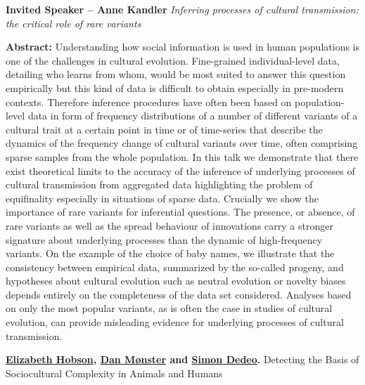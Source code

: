 \documentclass[]{article}
\date{}
\begin{document}
{\bf  Invited Speaker -- {Anne
Kandler} }{\it Inferring processes of cultural transmission: the critical
role of rare variants }

\textbf{Abstract:} Understanding how social information is used in human
populations is one of the challenges in cultural evolution. Fine-grained
individual-level data, detailing who learns from whom, would be most
suited to answer this question empirically but this kind of data is
difficult to obtain especially in pre-modern contexts. Therefore
inference procedures have often been based on population-level data in
form of frequency distributions of a number of different variants of a
cultural trait at a certain point in time or of time-series that
describe the dynamics of the frequency change of cultural variants over
time, often comprising sparse samples from the whole population. In this
talk we demonstrate that there exist theoretical limits to the accuracy
of the inference of underlying processes of cultural transmission from
aggregated data highlighting the problem of equifinality especially in
situations of sparse data. Crucially we show the importance of rare
variants for inferential questions. The presence, or absence, of rare
variants as well as the spread behaviour of innovations carry a stronger
signature about underlying processes than the dynamic of high-frequency
variants. On the example of the choice of baby names, we illustrate that
the consistency between empirical data, summarized by the so-called
progeny, and hypotheses about cultural evolution such as neutral
evolution or novelty biases depends entirely on the completeness of the
data set considered. Analyses based on only the most popular variants,
as is often the case in studies of cultural evolution, can provide
misleading evidence for underlying processes of cultural transmission.

{\bf {\href{http://hobsonresearch.com/}{Elizabeth Hobson},
\href{http://pure.au.dk/portal/en/danm@econ.au.dk}{Dan Mønster} and
\href{http://tuvalu.santafe.edu/~simon/}{Simon Dedeo}}. }{Detecting the
Basis of Sociocultural Complexity in Animals and Humans}
\end{document}
